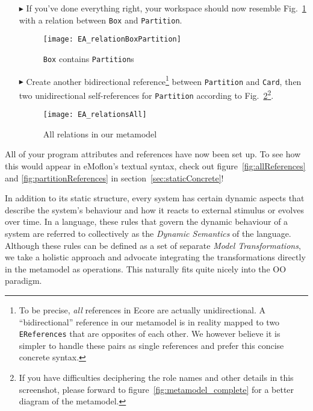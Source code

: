 \begin{enumerate}

\item[$\blacktriangleright$] If you've done everything right, your workspace should now resemble Fig.~\ref{fig:ereference_completed} with a relation between
\texttt{Box} and \texttt{Partition}.

\begin{figure}[htbp]
	\centering
  \texttt{[image: EA\_relationBoxPartition]}
	\caption{\texttt{Box} contains \texttt{Partition}s}
	\label{fig:ereference_completed}
\end{figure}
\FloatBarrier


\item[$\blacktriangleright$] Create another bidirectional reference\footnote{To be precise, \emph{all} references in Ecore are actually unidirectional.
A ``bidirectional'' reference in our metamodel is in reality mapped to two \texttt{EReferences} that are opposites of each other.
We however believe it is simpler to handle these pairs as single references and prefer this concise concrete syntax.} between \texttt{Partition} and
\texttt{Card}, then two unidirectional self-references for \texttt{Partition} according to Fig.~\ref{fig:ereferences_all}\footnote{If you have difficulties
deciphering the role names and other details in this screenshot, please forward to figure~\ref{fig:metamodel_complete} for a better diagram of the metamodel.}.

\begin{figure}[htbp]
	\centering
  \texttt{[image: EA\_relationsAll]}
	\caption{All relations in our metamodel}
	\label{fig:ereferences_all}
\end{figure}
\end{enumerate}
\FloatBarrier

All of your program attributes and references have now been set up. To see how this would appear in eMoflon's textual syntax, check out
figure~\ref{fig:allReferences} and \ref{fig:partitionReferences} in section~\ref{sec:staticConcrete}!

\vfill
\pagebreak

In addition to its static structure, every system has certain dynamic aspects that describe the system's behaviour and how it reacts to external stimulus or
evolves over time.  In a language, these rules that govern the dynamic behaviour of a system are referred to collectively as
the \emph{Dynamic Semantics} of the language.
Although these rules can be defined as a set of separate \emph{Model Transformations}, we take a holistic approach and advocate integrating the transformations
directly in the metamodel as operations. This naturally fits quite nicely into the OO paradigm.

